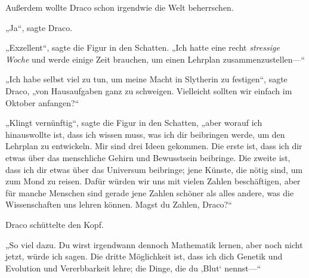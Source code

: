 Außerdem wollte Draco schon irgendwie die Welt beherrschen.

„Ja“, sagte Draco.

„Exzellent“, sagte die Figur in den Schatten. „Ich hatte eine recht \emph{stressige Woche} und werde einige Zeit brauchen, um einen Lehrplan zusammenzustellen—“

„Ich habe selbst viel zu tun, um meine Macht in Slytherin zu festigen“, sagte Draco, „von Hausaufgaben ganz zu schweigen. Vielleicht sollten wir einfach im Oktober anfangen?“

„Klingt vernünftig“, sagte die Figur in den Schatten, „aber worauf ich hinauswollte ist, dass ich wissen muss, was ich dir beibringen werde, um den Lehrplan zu entwickeln. Mir sind drei Ideen gekommen. Die erste ist, dass ich dir etwas über das menschliche Gehirn und Bewusstsein beibringe. Die zweite ist, dass ich dir etwas über das Universum beibringe; jene Künste, die nötig sind, um zum Mond zu reisen. Dafür würden wir uns mit vielen Zahlen beschäftigen, aber für manche Menschen sind gerade jene Zahlen schöner als alles andere, was die Wissenschaften uns lehren können. Magst du Zahlen, Draco?“

Draco schüttelte den Kopf.

„So viel dazu. Du wirst irgendwann dennoch Mathematik lernen, aber noch nicht jetzt, würde ich sagen. Die dritte Möglichkeit ist, dass ich dich Genetik und Evolution und Vererbbarkeit lehre; die Dinge, die du ‚Blut‘ nennst—“

